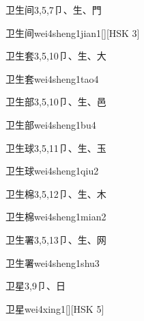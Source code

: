 \begin{entry}{卫生间}{3,5,7}{⼙、⽣、⾨}
  \begin{phonetics}{卫生间}{wei4sheng1jian1}[][HSK 3]
  \end{phonetics}
\end{entry}

\begin{entry}{卫生套}{3,5,10}{⼙、⽣、⼤}
  \begin{phonetics}{卫生套}{wei4sheng1tao4}
  \end{phonetics}
\end{entry}

\begin{entry}{卫生部}{3,5,10}{⼙、⽣、⾢}
  \begin{phonetics}{卫生部}{wei4sheng1bu4}
  \end{phonetics}
\end{entry}

\begin{entry}{卫生球}{3,5,11}{⼙、⽣、⽟}
  \begin{phonetics}{卫生球}{wei4sheng1qiu2}
  \end{phonetics}
\end{entry}

\begin{entry}{卫生棉}{3,5,12}{⼙、⽣、⽊}
  \begin{phonetics}{卫生棉}{wei4sheng1mian2}
  \end{phonetics}
\end{entry}

\begin{entry}{卫生署}{3,5,13}{⼙、⽣、⽹}
  \begin{phonetics}{卫生署}{wei4sheng1shu3}
  \end{phonetics}
\end{entry}

\begin{entry}{卫星}{3,9}{⼙、⽇}
  \begin{phonetics}{卫星}{wei4xing1}[][HSK 5]
  \end{phonetics}
\end{entry}

